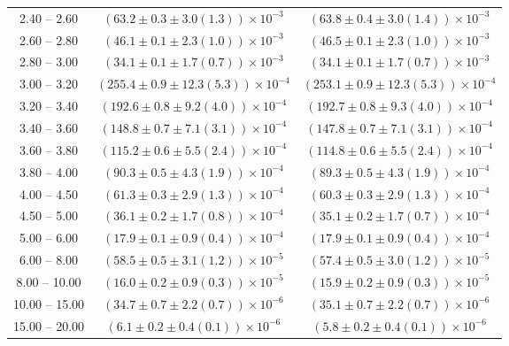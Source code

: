 \begin{table}
\begin{center}
\begin{tabular}{ c | c c }
2.40 -- 2.60 & $(63.2\pm0.3\pm3.0(1.3))\times10^{-3}$ & $(63.8\pm0.4\pm3.0(1.4))\times10^{-3}$ \\ 
2.60 -- 2.80 & $(46.1\pm0.1\pm2.3(1.0))\times10^{-3}$ & $(46.5\pm0.1\pm2.3(1.0))\times10^{-3}$ \\ 
2.80 -- 3.00 & $(34.1\pm0.1\pm1.7(0.7))\times10^{-3}$ & $(34.1\pm0.1\pm1.7(0.7))\times10^{-3}$ \\ 
3.00 -- 3.20 & $(255.4\pm0.9\pm12.3(5.3))\times10^{-4}$ & $(253.1\pm0.9\pm12.3(5.3))\times10^{-4}$ \\ 
3.20 -- 3.40 & $(192.6\pm0.8\pm9.2(4.0))\times10^{-4}$ & $(192.7\pm0.8\pm9.3(4.0))\times10^{-4}$ \\ 
3.40 -- 3.60 & $(148.8\pm0.7\pm7.1(3.1))\times10^{-4}$ & $(147.8\pm0.7\pm7.1(3.1))\times10^{-4}$ \\ 
3.60 -- 3.80 & $(115.2\pm0.6\pm5.5(2.4))\times10^{-4}$ & $(114.8\pm0.6\pm5.5(2.4))\times10^{-4}$ \\ 
3.80 -- 4.00 & $(90.3\pm0.5\pm4.3(1.9))\times10^{-4}$ & $(89.3\pm0.5\pm4.3(1.9))\times10^{-4}$ \\ 
4.00 -- 4.50 & $(61.3\pm0.3\pm2.9(1.3))\times10^{-4}$ & $(60.3\pm0.3\pm2.9(1.3))\times10^{-4}$ \\ 
4.50 -- 5.00 & $(36.1\pm0.2\pm1.7(0.8))\times10^{-4}$ & $(35.1\pm0.2\pm1.7(0.7))\times10^{-4}$ \\ 
5.00 -- 6.00 & $(17.9\pm0.1\pm0.9(0.4))\times10^{-4}$ & $(17.9\pm0.1\pm0.9(0.4))\times10^{-4}$ \\ 
6.00 -- 8.00 & $(58.5\pm0.5\pm3.1(1.2))\times10^{-5}$ & $(57.4\pm0.5\pm3.0(1.2))\times10^{-5}$ \\ 
8.00 -- 10.00 & $(16.0\pm0.2\pm0.9(0.3))\times10^{-5}$ & $(15.9\pm0.2\pm0.9(0.3))\times10^{-5}$ \\ 
10.00 -- 15.00 & $(34.7\pm0.7\pm2.2(0.7))\times10^{-6}$ & $(35.1\pm0.7\pm2.2(0.7))\times10^{-6}$ \\ 
15.00 -- 20.00 & $(6.1\pm0.2\pm0.4(0.1))\times10^{-6}$ & $(5.8\pm0.2\pm0.4(0.1))\times10^{-6}$ \\ 
\hline
\end{tabular}
\end{center}
\end{table}
 
